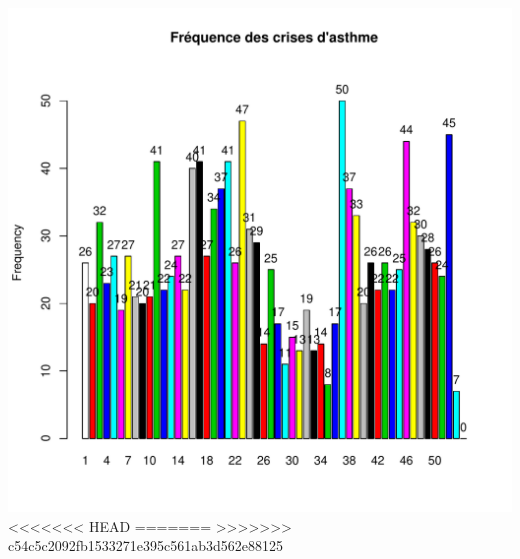 \documentclass[12pt,english,french,twoside]{book}\usepackage[]{graphicx}\usepackage[]{color}
\makeatletter
\def\maxwidth{ %
  \ifdim\Gin@nat@width>\linewidth
    \linewidth
  \else
    \Gin@nat@width
  \fi
}
\makeatother
\begin{document}
\includegraphics[width=\maxwidth]{figure/asthme22} 
<<<<<<< HEAD
=======
>>>>>>> c54c5c2092fb1533271e395c561ab3d562e88125
\end{document}
